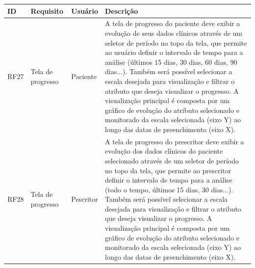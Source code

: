 \href{}{}\documentclass[12pt,portuguese,oneside]{article}
\begin{document}
\begin{table}[H]
\centering
{}
\begin{tabularx}{\textwidth}{|>{\raggedright\arraybackslash}p{1cm}|>{\raggedright\arraybackslash}p{3cm}|>{\raggedright\arraybackslash}p{2cm}|>{\raggedright\arraybackslash}X|}
\hline
\rowcolor{gray!20}
\textbf{ID} & \textbf{Requisito} & \textbf{Usuário} & \textbf{Descrição}\\
\hline
RF27 & Tela de progresso & Paciente & A tela de progresso do paciente deve exibir a evolução de seus dados clínicos através de um seletor de período no topo da tela, que permite ao usuário definir o intervalo de tempo para a análise (últimos 15 dias, 30 dias, 60 dias, 90 dias...). Também será possível selecionar a escala desejada para visualização e filtrar o atributo que deseja visualizar o progresso. A visualização principal é composta por um gráfico de evolução do atributo selecionado e monitorado da escala selecionada (eixo Y) ao longo das datas de preenchimento (eixo X).\\
\hline
RF28 & Tela de progresso & Pescritor & A tela de progresso do prescritor deve exibir a evolução dos dados clínicos do paciente selecionado através de um seletor de período no topo da tela, que permite ao prescritor definir o intervalo de tempo para a análise (todo o tempo, últimos 15 dias, 30 dias...). Também será possível selecionar a escala desejada para visualização e filtrar o atributo que deseja visualizar o progresso. A visualização principal é composta por um gráfico de evolução do atributo selecionado e monitorado da escala selecionada (eixo Y) ao longo das datas de preenchimento (eixo X).\\
\hline
\end{tabularx}
\end{table}
\end{document}
